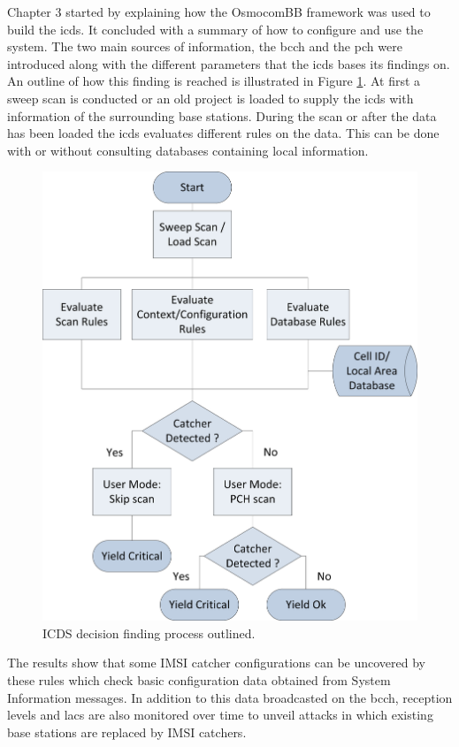 Chapter 3 started by explaining how the OsmocomBB framework was used to build the \gls{icds}.
It concluded with a summary of how to configure and use the system.
The two main sources of information, the \gls{bcch} and the \gls{pch} were introduced along with the different parameters that the \gls{icds} bases its findings on.
An outline of how this finding is reached is illustrated in Figure \ref{fig:decision_process}.
At first a sweep scan is conducted or an old project is loaded to supply the \gls{icds} with information of the surrounding base stations.
During the scan or after the data has been loaded the \gls{icds} evaluates different rules on the data.
This can be done with or without consulting databases containing local information.
\begin{figure}
\centering
\includegraphics{../Images/flowchart}
\caption{ICDS decision finding process outlined.}
\label{fig:decision_process}
\end{figure}
The results show that some IMSI catcher configurations can be uncovered by these rules which check basic configuration data obtained from System Information messages.
In addition to this data broadcasted on the \gls{bcch}, reception levels and \glspl{lac} are also monitored over time to unveil attacks in which existing base stations are replaced by IMSI catchers.
